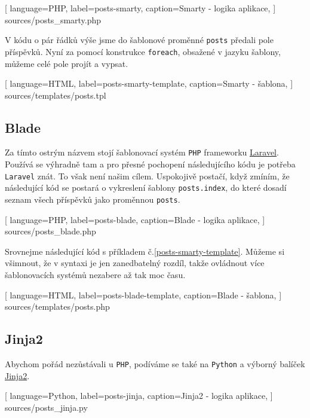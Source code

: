 \documentclass[10pt,a4paper]{article}
\begin{document}
			
			[
				language=PHP,
				label=posts-smarty,
				caption={Smarty - logika aplikace},
			] {sources/posts_smarty.php}
			\vspace{10pt}

			V kódu o pár řádků výše jsme do šablonové proměnné \texttt{posts} předali pole příspěvků. Nyní za pomocí konstrukce \texttt{foreach}, obsažené v jazyku šablony, můžeme celé pole projít a vypsat.
			
			
			[
				language=HTML,
				label=posts-smarty-template,
				caption={Smarty - šablona},
			] {sources/templates/posts.tpl}
			\vspace{10pt}
		
		
		\newpage
		\subsection{Blade}
			Za tímto ostrým názvem stojí šablonovací systém \texttt{PHP} frameworku \href{http://laravel.com/}{Laravel}. Používá se výhradně tam a pro přesné pochopení následujícího kódu je potřeba \texttt{Laravel} znát. To však není našim cílem. Uspokojivě postačí, když zmíním, že následující kód se postará o vykreslení šablony \texttt{posts.index}, do které dosadí seznam všech příspěvků jako proměnnou \texttt{posts}.
			
			
			[
				language=PHP,
				label=posts-blade,
				caption={Blade - logika aplikace},
			] {sources/posts_blade.php}
			\vspace{10pt}
			
			Srovnejme následující kód s příkladem č.\ref{posts-smarty-template}. Můžeme si všimnout, že v syntaxi je jen zanedbatelný rozdíl, takže ovládnout více šablonovacích systémů nezabere až tak moc času.
			
			[
				language=HTML,
				label=posts-blade-template,
				caption={Blade - šablona},
			] {sources/templates/posts.php}
			\vspace{10pt}


		\newpage
		\subsection{Jinja2}
			Abychom pořád nezůstávali u \texttt{PHP}, podíváme se také na \texttt{Python} a výborný balíček \href{http://jinja.pocoo.org/}{Jinja2}.
		
			
			[
				language=Python,
				label=posts-jinja,
				caption={Jinja2 - logika aplikace},
			] {sources/posts_jinja.py}
			\vspace{10pt}
			
\end{document}
